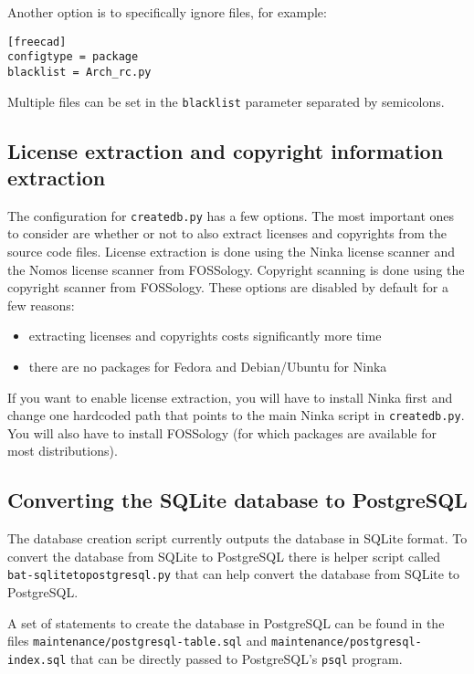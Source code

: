 \documentclass[10pt,a4paper]{article}
\begin{document}
Another option is to specifically ignore files, for example:

\begin{verbatim}
[freecad]
configtype = package
blacklist = Arch_rc.py
\end{verbatim}

Multiple files can be set in the \texttt{blacklist} parameter separated by
semicolons.

\subsection{License extraction and copyright information extraction}

The configuration for \texttt{createdb.py} has a few options. The most important
ones to consider are whether or not to also extract licenses and copyrights from
the source code files.  License extraction is done using the Ninka license
scanner and the Nomos license scanner from FOSSology. Copyright scanning is done
using the copyright scanner from FOSSology. These options are disabled
by default for a few reasons:

\begin{itemize}
\item extracting licenses and copyrights costs significantly more time
\item there are no packages for Fedora and Debian/Ubuntu for Ninka
\end{itemize}

If you want to enable license extraction, you will have to install Ninka first
and change one hardcoded path that points to the main Ninka script in
\texttt{createdb.py}. You will also have to install FOSSology
(for which packages are available for most distributions).

\subsection{Converting the SQLite database to PostgreSQL}

The database creation script currently outputs the database in SQLite format.
To convert the database from SQLite to PostgreSQL there is helper script called
\texttt{bat-sqlitetopostgresql.py} that can help convert the database from
SQLite to PostgreSQL.

A set of statements to create the database in PostgreSQL can be found in the
files \texttt{maintenance/postgresql-table.sql} and
\texttt{maintenance/postgresql-index.sql} that can be directly passed to
PostgreSQL's \texttt{psql} program.
\end{document}
